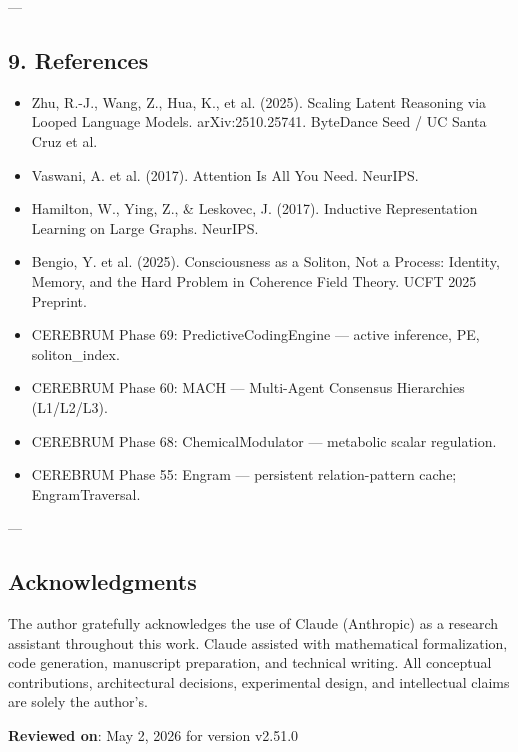 ---

\subsection{9. References}

\begin{itemize}
\item [zhu\-2025\-loooplm] Zhu, R.-J., Wang, Z., Hua, K., et al. (2025). Scaling Latent Reasoning via Looped Language Models. arXiv:2510.25741. ByteDance Seed / UC Santa Cruz et al.
\item [vaswani\-2017\-attention] Vaswani, A. et al. (2017). Attention Is All You Need. NeurIPS.
\item [hamilton\-2017\-graphsage] Hamilton, W., Ying, Z., \& Leskovec, J. (2017). Inductive Repres\-entation Learning on Large Graphs. NeurIPS.
\item [bengio\-2025\-soliton] Bengio, Y. et al. (2025). Consci\-ousness as a Soliton, Not a Process: Identity, Memory, and the Hard Problem in Coherence Field Theory. UCFT 2025 Preprint.
\item [Phase 69] CEREBRUM Phase 69: PredictiveCodingEngine — active inference, PE, soliton\_index.
\item [Phase 60] CEREBRUM Phase 60: MACH — Multi-Agent Consensus Hierarchies (L1/L2/L3).
\item [Phase 68] CEREBRUM Phase 68: ChemicalModulator — metabolic scalar regulation.
\item [Phase 55] CEREBRUM Phase 55: Engram — persistent relation-pattern cache; EngramTraversal.

\end{itemize}
---
\subsection{Acknow\-ledgments}

The author gratefully ackno\-wledges the use of Claude (Anthropic) as a research assistant throughout this work. Claude assisted with mathe\-matical forma\-lization, code generation, manuscript preparation, and technical writing. All conceptual contr\-ibutions, archi\-tectural decisions, exper\-imental design, and intel\-lectual claims are solely the author's.

\textbf{Reviewed on}: May 2, 2026 for version v2.51.0
